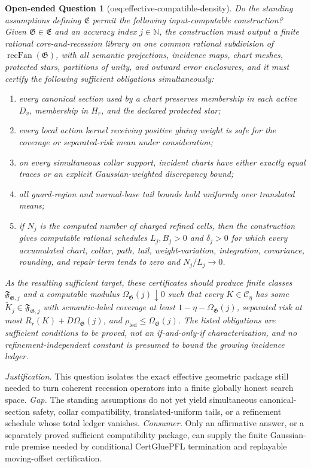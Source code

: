 \documentclass{article}
\newtheorem{openendedquestion}{Open-ended Question}
\begin{document}
\begin{openendedquestion}[oeq:effective-compatible-density]\label{oeq:effective-compatible-density}
Do the standing assumptions defining \(\mathfrak E\) permit the following input-computable construction?  Given \(\mathfrak G\in\mathfrak E\) and an accuracy index \(j\in\mathbb N\), the construction must output a finite rational core-and-recession library on one common rational subdivision of \(\operatorname{recFan}(\mathfrak G)\), with all semantic projections, incidence maps, chart meshes, protected stars, partitions of unity, and outward error enclosures, and it must certify the following sufficient obligations simultaneously:
\begin{enumerate}
\item every canonical section used by a chart preserves membership in each active \(D_v\), membership in \(H_r\), and the declared protected star;
\item every local action kernel receiving positive gluing weight is safe for the coverage or separated-risk mean under consideration;
\item on every simultaneous collar support, incident charts have either exactly equal traces or an explicit Gaussian-weighted discrepancy bound;
\item all guard-region and normal-base tail bounds hold uniformly over translated means;
\item if \(N_j\) is the computed number of charged refined cells, then the construction gives computable rational schedules \(L_j,B_j>0\) and \(\delta_j>0\) for which every accumulated chart, collar, path, tail, weight-variation, integration, covariance, rounding, and repair term tends to zero and \(N_j/L_j\to0\).
\end{enumerate}
As the resulting sufficient target, these certificates should produce finite classes \(\mathfrak F_{\mathfrak G,j}\) and a computable modulus \(\Omega_{\mathfrak G}(j)\downarrow0\) such that every \(K\in\mathcal C_\eta\) has some \(\widetilde K_j\in\mathfrak F_{\mathfrak G,j}\) with semantic-label coverage at least \(1-\eta-\Omega_{\mathfrak G}(j)\), separated risk at most \(R_r(K)+D\Omega_{\mathfrak G}(j)\), and \(\rho_{\mathrm{led}}\leq\Omega_{\mathfrak G}(j)\).  The listed obligations are sufficient conditions to be proved, not an if-and-only-if characterization, and no refinement-independent constant is presumed to bound the growing incidence ledger.
\end{openendedquestion}
\par\smallskip\noindent \textit{Justification.} This question isolates the exact effective geometric package still needed to turn coherent recession operators into a finite globally honest search space. \textit{Gap.} The standing assumptions do not yet yield simultaneous canonical-section safety, collar compatibility, translated-uniform tails, or a refinement schedule whose total ledger vanishes. \textit{Consumer.} Only an affirmative answer, or a separately proved sufficient compatibility package, can supply the finite Gaussian-rule premise needed by conditional CertGluePFL termination and replayable moving-offset certification.
\end{document}
